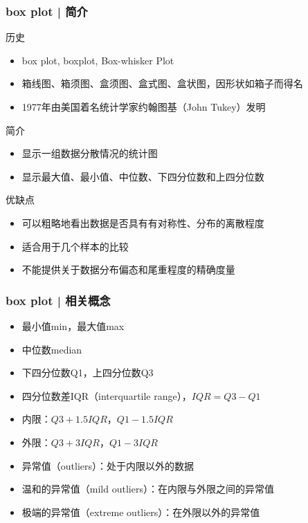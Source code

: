 \begin{frame}
  \frametitle{box plot | 简介}
  \begin{block}{历史}
  \begin{itemize}
    \item box plot, boxplot, Box-whisker Plot
    \item 箱线图、箱须图、盒须图、盒式图、盒状图，因形状如箱子而得名
    \item 1977年由美国着名统计学家约翰\textbullet 图基（John Tukey）发明
  \end{itemize}
  \end{block}
  \pause
  \begin{block}{简介}
  \begin{itemize}
    \item 显示一组数据分散情况的统计图
    \item 显示最大值、最小值、中位数、下四分位数和上四分位数
  \end{itemize}
  \end{block}
  \pause
  \begin{block}{优缺点}
  \begin{itemize}
    \item 可以粗略地看出数据是否具有有对称性、分布的离散程度
    \item 适合用于几个样本的比较
    \item 不能提供关于数据分布偏态和尾重程度的精确度量
  \end{itemize}
  \end{block}
\end{frame}

\begin{frame}
  \frametitle{box plot | 相关概念}
  \begin{itemize}[<+-|alert@+>]
    \item 最小值min，最大值max
    \item 中位数median
    \item 下四分位数Q1，上四分位数Q3
    \item 四分位数差IQR（interquartile range），$IQR = Q3-Q1$
    \item 内限：$Q3 + 1.5IQR$，$Q1 - 1.5IQR$
    \item 外限：$Q3 + 3IQR$，$Q1 - 3IQR$
    \item 异常值（outliers）：处于内限以外的数据
    \item 温和的异常值（mild outliers）：在内限与外限之间的异常值
    \item 极端的异常值（extreme outliers）：在外限以外的异常值
  \end{itemize}
\end{frame}

